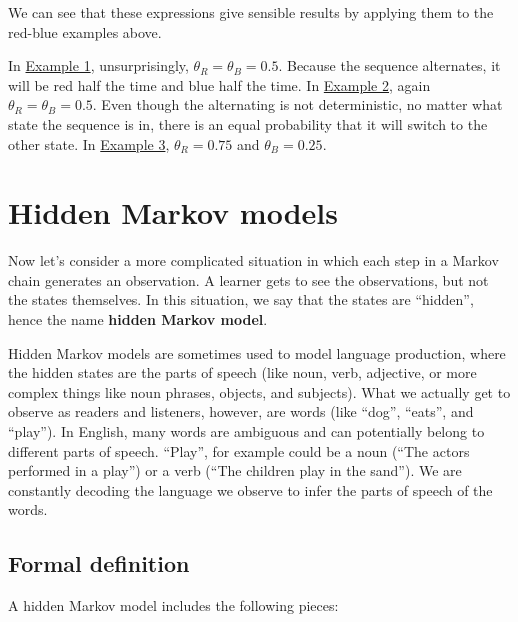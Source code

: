 \documentclass[
  letterpaper,
  DIV=11,
  numbers=noendperiod]{scrreprt}
\begin{document}
We can see that these expressions give sensible results by applying them
to the red-blue examples above.

In \hyperref[markov-example1]{Example 1}, unsurprisingly,
\(\theta_R = \theta_B = 0.5\). Because the sequence alternates, it will
be red half the time and blue half the time. In
\hyperref[markov-example2]{Example 2}, again
\(\theta_R = \theta_B = 0.5\). Even though the alternating is not
deterministic, no matter what state the sequence is in, there is an
equal probability that it will switch to the other state. In
\hyperref[markov-example3]{Example 3}, \(\theta_R = 0.75\) and
\(\theta_B = 0.25\).

\section{Hidden Markov models 🙈}\label{hmms}

Now let's consider a more complicated situation in which each step in a
Markov chain generates an observation. A learner gets to see the
observations, but not the states themselves. In this situation, we say
that the states are ``hidden'', hence the name \textbf{hidden Markov
model}.

Hidden Markov models are sometimes used to model language production,
where the hidden states are the parts of speech (like noun, verb,
adjective, or more complex things like noun phrases, objects, and
subjects). What we actually get to observe as readers and listeners,
however, are words (like ``dog'', ``eats'', and ``play''). In English,
many words are ambiguous and can potentially belong to different parts
of speech. ``Play'', for example could be a noun (``The actors performed
in a play'') or a verb (``The children play in the sand''). We are
constantly decoding the language we observe to infer the parts of speech
of the words.

\subsection{Formal definition}\label{formal-definition}

A hidden Markov model includes the following pieces:
\end{document}

